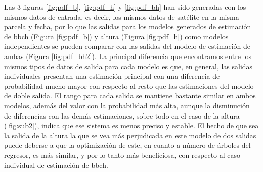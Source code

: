 \par Las 3 figuras \ref{fig:pdf_b}, \ref{fig:pdf_h} y \ref{fig:pdf_bh} han sido generadas con los mismos datos de entrada, es decir, los mismos datos de satélite en la misma parcela y fecha, por lo que las salidas para los modelos generados de estimación de \gls{bbch} (Figura \ref{fig:pdf_b}) y altura (Figura \ref{fig:pdf_h}) como modelos independientes se pueden comparar con las salidas del modelo de estimación de ambas (Figura \ref{fig:pdf_bh2}). La principal diferencia que encontramos entre los mismos tipos de datos de salida para cada modelo es que, en general, las salidas individuales presentan una estimación principal con una diferencia de probabilidad mucho mayor con respecto al resto que las estimaciones del modelo de doble salida. El rango para cada salida se mantiene bastante similar en ambos modelos, además del valor con la probabilidad más alta, aunque la disminución de diferencias con las demás estimaciones, sobre todo en el caso de la altura (\ref{fig:sub2}), indica que ese sistema es menos preciso y estable. El hecho de que sea la salida de la altura la que se vea más perjudicada en este modelo de dos salidas puede deberse a que la optimización de este, en cuanto a número de árboles del regresor, es más similar, y por lo tanto más beneficiosa, con respecto al caso individual de estimación de \gls{bbch}.

